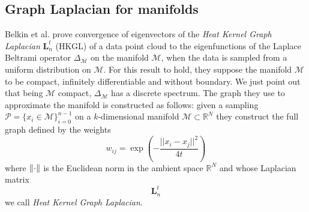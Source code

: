 \subsection{Graph Laplacian for manifolds}\label{sec:Chapter1:theoretical foundations}
Belkin et al. \cite{NIPS2006_2989} prove convergence of eigenvectors of the \textit{Heat Kernel Graph Laplacian} $\mathbf L_n^t$ (HKGL) of a data point cloud to the eigenfunctions of the Laplace Beltrami operator $\Delta_\mathcal M$ on the manifold $\mathcal M$, when the data is sampled from a uniform distribution on $\mathcal M$.
For this result to hold, they suppose the manifold $\mathcal M$ to be compact, infinitely differentiable and without boundary. We just point out that being $\mathcal M$ compact, $\Delta_\mathcal M$ has a discrete spectrum. The graph they use to approximate the manifold is constructed as follows: given a sampling $ \mathcal P = \{x_i\in\mathcal M\}_{i=0}^{n-1}$ on a $k$-dimensional manifold $\mathcal M\subset \mathbb R^N$ they construct the full graph defined by the weights 
$$
w_{ij}=\exp\left({-\frac{||x_i-x_j||^2}{4t}}\right)
$$
where $\left\lVert\cdot\right\rVert$ is the Euclidean norm in the ambient space $\mathbb R^N$ and whose Laplacian matrix 
$$
\mathbf L_n^t
$$ we call \textit{Heat Kernel Graph Laplacian}.

